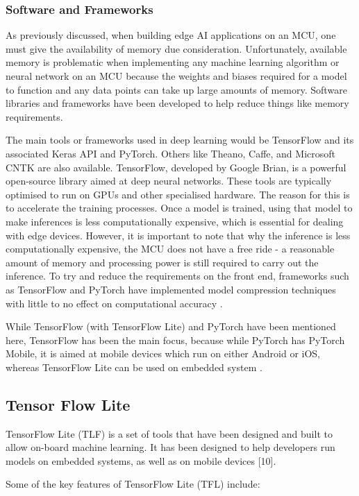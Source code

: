 \documentclass[conference]{IEEEtran}
\begin{document}
\subsubsection{Software and Frameworks}
As previously discussed, when building edge AI applications on an MCU, one must give the availability of memory due consideration. Unfortunately, available memory is problematic when implementing any machine learning algorithm or neural network on an MCU because the weights and biases required for a model to function and any data points can take up large amounts of memory. Software libraries and frameworks have been developed to help reduce things like memory requirements.

The main tools or frameworks used in deep learning would be TensorFlow and its associated Keras API and PyTorch. Others like Theano, Caffe, and Microsoft CNTK are also available. TensorFlow, developed by Google Brian, is a powerful open-source library aimed at deep neural networks. These tools are typically optimised to run on GPUs and other specialised hardware. The reason for this is to accelerate the training processes. Once a model is trained, using that model to make inferences is less computationally expensive, which is essential for dealing with edge devices. However, it is important to note that why the inference is less computationally expensive, the MCU does not have a free ride - a reasonable amount of memory and processing power is still required to carry out the inference. To try and reduce the requirements on the front end, frameworks such as TensorFlow and PyTorch have implemented model compression techniques with little to no effect on computational accuracy \cite{tuomo}. 

While TensorFlow (with TensorFlow Lite) and PyTorch have been mentioned here, TensorFlow has been the main focus, because while PyTorch has PyTorch Mobile, it is aimed at mobile devices which run on either Android or iOS, whereas TensorFlow Lite can be used on embedded system \cite{tuomo} \cite{tfl1}.

\subsection{Tensor Flow Lite}
TensorFlow Lite (TLF) is a set of tools that have been designed and built to allow on-board machine learning. It has been designed to help developers run models on embedded systems, as well as on mobile devices [10].

Some of the key features of TensorFlow Lite (TFL) include:
\end{document}
